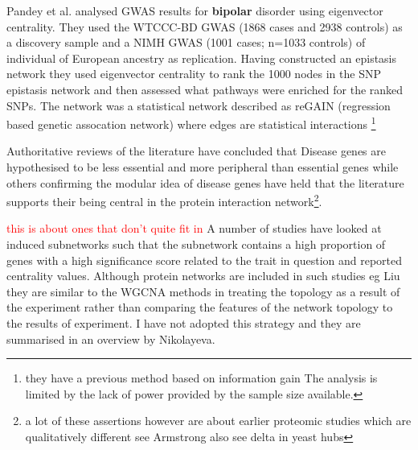 Pandey et al.\cite{pandey2012epistasis} analysed GWAS results for \textbf{bipolar} disorder using eigenvector centrality. They used the WTCCC-BD GWAS (1868 cases and 2938 controls) as a discovery sample and  a NIMH GWAS (1001 cases; n=1033 controls) of individual of European ancestry as replication. Having constructed an epistasis network they used eigenvector centrality to rank the 1000 nodes in the SNP epistasis network and then assessed what pathways were enriched for the ranked SNPs. The network was a statistical network described as reGAIN (regression based genetic assocation network) where edges are statistical interactions \footnote{they have a previous method based on information gain The analysis is limited by the lack of power provided by the sample size available.}

Authoritative reviews of the literature have concluded that Disease genes are hypothesised to be less essential\cite{barabasi2011network} and more peripheral than essential genes while others confirming the modular idea of disease genes have held that the literature supports their being central in the protein interaction network\cite{ideker2008protein}\footnote{a lot of these assertions however are about earlier proteomic studies which are qualitatively different see Armstrong also see delta in yeast hubs}.

\textcolor{red}{this is about ones that don't quite fit in}
A number of studies have looked at induced subnetworks such that the subnetwork contains a high proportion of genes with a high significance score related to the trait in question and reported centrality values. Although protein networks are included in such studies eg Liu they are similar to the WGCNA methods in treating the topology as a result of the experiment rather than comparing the features of the network topology to the results of experiment. I have not adopted this strategy and they are summarised in an overview by Nikolayeva\cite{nikolayeva2018network}.

  
